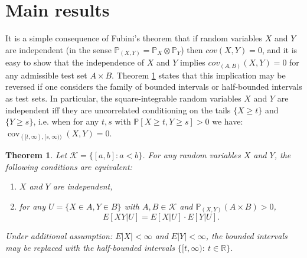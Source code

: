 \documentclass[sn-mathphys,Numbered,11pt]{sn-jnl}%
\theoremstyle{thmstyleone}%
\newtheorem{theorem}{Theorem}%
\newcommand{\R}{\mathbb{R}}
\newcommand{\PP}{\mathbb{P}}
\newcommand{\cov}{\operatorname{cov}}
\begin{document}
\section{Main results}\label{S4}
It is a simple consequence of Fubini's theorem that if random variables $X$ and $Y$ are independent (in the sense $\PP_{(X,Y)}=\PP_X\otimes\PP_Y$) then  $cov(X,Y)=0$, and it is easy to show that the independence of $X$ and $Y$  implies $cov_{(A,B)}(X,Y)=0$ for any admissible test set $A\times B$. Theorem \ref{T1}  states that this implication may be reversed if one considers the family of bounded intervals or half-bounded intervals as test sets. In particular, the square-integrable random variables $X$ and $Y$ are independent iff they are uncorrelated conditioning on the tails $\{X\geq t\}$ and $\{Y\geq s\}$, i.e. when for any $t,s$ with $\PP[X\geq t, Y\geq s]>0$ we have: $\cov_{([t,\infty),[s,\infty))}(X,Y)=0$.\\

\begin{theorem}\label{T1}
Let  $\mathcal{K}=\{[a,b]\colon a<b\}$. For any random variables $X$ and $Y$, the following conditions are equivalent:
\begin{enumerate}
\item[1)] $X$ and $Y$ are independent,
\item[2)] for any $U=\{X\in A, Y\in B\}$ with $A, B\in \mathcal{K}$ and $\PP_{(X,Y)}(A\times B)>0$,$$E[XY|U]=E[X| U]\cdot E[Y|U].$$

\end{enumerate}
Under additional assumption: $E|X|<\infty$ and $E|Y|<\infty$, the  bounded intervals may be replaced with the half-bounded intervals $\{[t,\infty)\colon\ t\in \R\}$.
\end{theorem}
\end{document}

